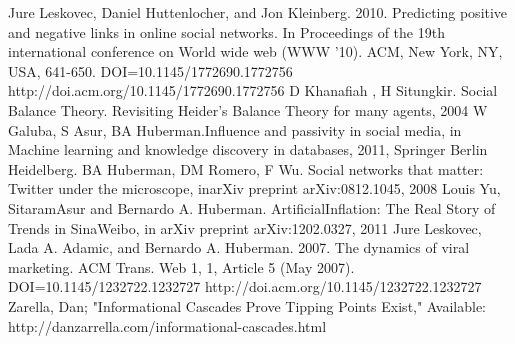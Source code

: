 \documentclass[conference,letterpaper]{IEEEtran}
\begin{document}
\begin{thebibliography}{1}
Jure Leskovec, Daniel Huttenlocher, and Jon Kleinberg. 2010. Predicting positive and negative links in online social networks. In Proceedings of the 19th international conference on World wide web (WWW '10). ACM, New York, NY, USA, 641-650. DOI=10.1145/1772690.1772756 http://doi.acm.org/10.1145/1772690.1772756
D Khanafiah , H Situngkir. Social Balance Theory. Revisiting Heider’s Balance Theory for many agents, 2004
W Galuba, S Asur, BA Huberman.Influence and passivity in social media, in Machine learning and knowledge discovery in databases, 2011, Springer Berlin Heidelberg.
BA Huberman, DM Romero, F Wu. Social networks that matter: Twitter under the microscope, inarXiv preprint arXiv:0812.1045, 2008
Louis Yu, SitaramAsur and Bernardo A. Huberman. ArtificialInflation: The Real Story of Trends in SinaWeibo, in arXiv preprint arXiv:1202.0327, 2011
Jure Leskovec, Lada A. Adamic, and Bernardo A. Huberman. 2007. The dynamics of viral marketing. ACM Trans. Web 1, 1, Article 5 (May 2007). DOI=10.1145/1232722.1232727 http://doi.acm.org/10.1145/1232722.1232727
Zarella, Dan; "Informational Cascades Prove Tipping Points Exist," Available: http://danzarrella.com/informational-cascades.html
\end{thebibliography}
\end{document}
